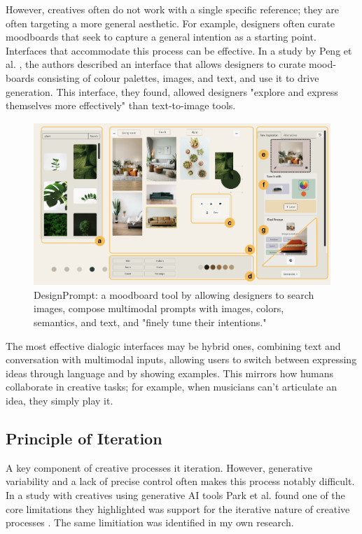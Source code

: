 However, creatives often do not work with a single specific reference; they are often targeting a more general aesthetic. For example, designers often curate moodboards that seek to capture a general intention as a starting point. Interfaces that accommodate this process can be effective. In a study by Peng et al. \cite{Peng2024-tr}, the authors described an interface that allows designers to curate mood-boards consisting of colour palettes, images, and text, and use it to drive generation. This interface, they found, allowed designers "explore and express themselves more effectively" than text-to-image tools.

\begin{figure}
    \centering
    \includegraphics[width=1\linewidth]{designprompt.png}
    \caption{DesignPrompt: a moodboard tool by \cite{Peng2024-tr} allowing designers to search images, compose multimodal prompts with images, colors, semantics, and text, and "finely tune their intentions."}
    \label{fig:enter-label}
\end{figure}

The most effective dialogic interfaces may be hybrid ones, combining text and conversation with multimodal inputs, allowing users to switch between expressing ideas through language and by showing examples. This mirrors how humans collaborate in creative tasks; for example, when musicians can't articulate an idea, they simply play it.

\subsection{Principle of Iteration}

A key component of creative processes it iteration. However, generative variability and a lack of precise control often makes this process notably difficult. In a study with creatives using generative AI tools Park et al. found one of the core limitations they highlighted was support for the iterative nature of creative processes \cite{Park2024-gw}. The same limitiation was identified in my own research. 

